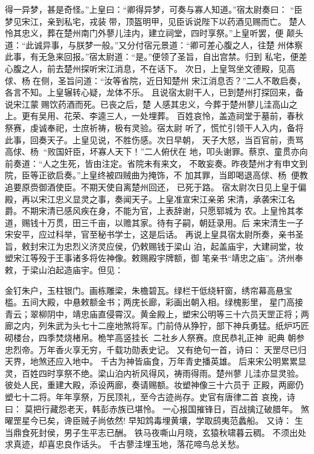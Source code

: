 得一异梦，甚是奇怪。”上皇曰：“卿得异梦，可奏与寡人知道。”宿太尉奏曰：
“臣梦见宋江，亲到私宅，戎装带，顶盔明甲，见臣诉说陛下以药酒见赐而亡。
楚人怜其忠义，葬在楚州南门外蓼儿洼内，建立祠堂，四时享祭。”上皇听罢，便
颠头道：“此诚异事，与朕梦一般。”又分付宿元景道：“卿可差心腹之人，往楚
州体察此事，有无急来回报。”宿太尉道：“是。”便领了圣旨，自出宫禁。归到
私宅，便差心腹之人，前去楚州探听宋江消息，不在话下。
次日，上皇驾坐文德殿，见高俅、杨在侧，圣旨问道：“汝等省院，近日知楚州
宋江消息否？”二人不敢启奏，各言不知。上皇辗转心疑，龙体不乐。
且说宿太尉干人，已到楚州打探回来，备说宋江蒙赐饮药酒而死。已丧之后，楚
人感其忠义，今葬于楚州蓼儿洼高山之上。更有吴用、花荣、李逵三人，一处埋葬。
百姓哀怜，盖造祠堂于墓前，春秋祭赛，虔诚奉祀，士庶祈祷，极有灵验。宿太尉
听了，慌忙引领干人入内，备将此事，回奏天子。上皇见说，不胜伤感。次日早朝，
天子大怒，当百官前，责骂高俅、杨：“败国奸臣，坏寡人天下！”二人俯伏在
地，叩头谢罪。蔡京、童贯亦向前奏道：“人之生死，皆由注定。省院未有来文，
不敢妄奏。昨夜楚州才有申文到院，臣等正欲启奏。”上皇终被四贼曲为掩饰，不
加其罪，当即喝退高俅、杨，便教追要原赍御酒使臣。不期天使自离楚州回还，
已死于路。
宿太尉次日见上皇于偏殿，再以宋江忠义显灵之事，奏闻天子。上皇准宣宋江亲弟
宋清，承袭宋江名爵。不期宋清已感风疾在身，不能为官，上表辞谢，只愿郓城为
农。上皇怜其孝道，赐钱十万贯，田三千亩，以赡其家。待有子嗣，朝廷录用。后
来宋清生一子宋安平，应过科举，官至秘书学士，这是后话。
再说上皇具宿太尉所奏，亲书圣旨，敕封宋江为忠烈义济灵应侯，仍敕赐钱于梁山
泊，起盖庙宇，大建祠堂，妆塑宋江等殁于王事诸多将佐神像。敕赐殿宇牌额，御
笔亲书“靖忠之庙”。济州奉敕，于梁山泊起造庙宇。但见：

金钉朱户，玉柱银门。画栋雕梁，朱檐碧瓦。绿栏干低绕轩窗，绣帘幕高悬宝
槛。五间大殿，中悬敕额金书；两庑长廊，彩画出朝入相。绿槐影里，星门高接
青云；翠柳阴中，靖忠庙直侵霄汉。黄金殿上，塑宋公明等三十六员天罡正将；两
廊之内，列朱武为头七十二座地煞将军。门前侍从狰狞，部下神兵勇猛。纸炉巧匠
砌楼台，四季焚烧楮帛。桅竿高竖挂长，二社乡人祭赛。庶民恭礼正神，祀典
朝参忠烈帝。万年香火享无穷，千载功勋表史记。
又有绝句一首，诗曰：
天罡尽已归天界，地煞还应入地中。
千古为神皆庙食，万年青史播英雄。
后来宋公明累累显灵，百姓四时享祭不绝。梁山泊内祈风得风，祷雨得雨。楚州蓼
儿洼亦显灵验。彼处人民，重建大殿，添设两廊，奏请赐额。妆塑神像三十六员于
正殿，两廊仍塑七十二将。年年享祭，万民顶礼，至今古迹尚存。史官有唐律二首
哀挽，诗曰：
莫把行藏怨老天，韩彭赤族已堪怜。
一心报国摧锋日，百战擒辽破腊年。
煞曜罡星今已矣，谗臣贼子尚依然!
早知鸩毒埋黄壤，学取鸱夷范蠡船。
又诗：
生当鼎食死封侯，男子生平志已酬。
铁马夜嘶山月晓，玄猿秋啸暮云稠。
不须出处求真迹，却喜忠良作话头。
千古蓼洼埋玉地，落花啼鸟总关愁。